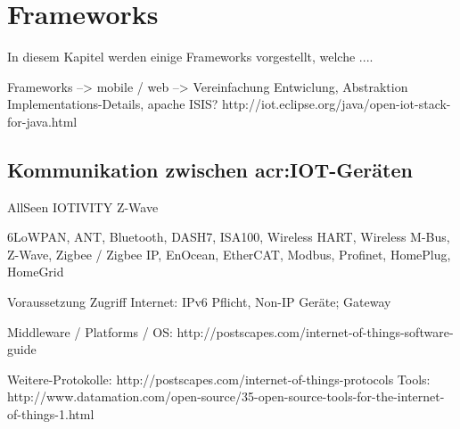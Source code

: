 \section{Frameworks}
In diesem Kapitel werden einige Frameworks vorgestellt, welche ....

Frameworks --> mobile / web --> Vereinfachung Entwiclung, Abstraktion Implementations-Details, 
apache ISIS?
http://iot.eclipse.org/java/open-iot-stack-for-java.html

\subsection{Kommunikation zwischen \gls{acr:IOT}-Geräten}
AllSeen
IOTIVITY
Z-Wave






6LoWPAN, ANT, Bluetooth, DASH7, ISA100, Wireless HART, Wireless M-Bus, Z-Wave, Zigbee / Zigbee IP, EnOcean, EtherCAT, Modbus, Profinet, HomePlug, HomeGrid


Voraussetzung Zugriff Internet: IPv6 Pflicht, Non-IP Geräte; Gateway


Middleware / Platforms / OS: http://postscapes.com/internet-of-things-software-guide

Weitere-Protokolle: http://postscapes.com/internet-of-things-protocols
Tools: http://www.datamation.com/open-source/35-open-source-tools-for-the-internet-of-things-1.html